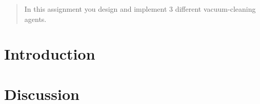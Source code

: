 \documentclass[12pt]{article}
\begin{document}
\maketitle

\begin{abstract}
In this assignment you design and implement 3 different vacuum-cleaning agents.
\end{abstract}

\section{Introduction}






\section{Discussion}



\end{document}
